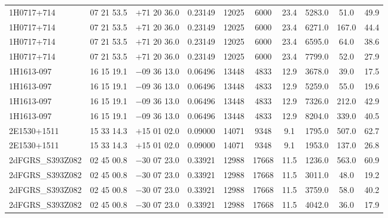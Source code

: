 \begin{landscape}
\begin{center}
\begin{longtable}{l c c c c c c c c c}
1H0717+714  &              07 21 53.5  &         $+$71 20 36.0  &       0.23149  & 12025  &   6000  &       23.4  &      5283.0  &  51.0  &   49.9  \\
1H0717+714  &              07 21 53.5  &         $+$71 20 36.0  &       0.23149  & 12025  &   6000  &       23.4  &      6271.0  &  167.0  &  44.4  \\
1H0717+714  &              07 21 53.5  &         $+$71 20 36.0  &       0.23149  & 12025  &   6000  &       23.4  &      6595.0  &  64.0  &   38.6  \\
1H0717+714  &              07 21 53.5  &         $+$71 20 36.0  &       0.23149  & 12025  &   6000  &       23.4  &      7799.0  &  52.0  &   27.9  \\
1H1613-097  &              16 15 19.1  &         $-$09 36 13.0  &       0.06496  & 13448  &   4833  &       12.9  &      3678.0  &  39.0  &   17.5  \\
1H1613-097  &              16 15 19.1  &         $-$09 36 13.0  &       0.06496  & 13448  &   4833  &       12.9  &      5259.0  &  55.0  &   19.6  \\
1H1613-097  &              16 15 19.1  &         $-$09 36 13.0  &       0.06496  & 13448  &   4833  &       12.9  &      7326.0  &  212.0  &  42.9  \\
1H1613-097  &              16 15 19.1  &         $-$09 36 13.0  &       0.06496  & 13448  &   4833  &       12.9  &      8204.0  &  339.0  &  40.5  \\
2E1530+1511  &             15 33 14.3  &         $+$15 01 02.0  &       0.09000  & 14071  &   9348  &       9.1  &       1795.0  &  507.0  &  62.7  \\
2E1530+1511  &             15 33 14.3  &         $+$15 01 02.0  &       0.09000  & 14071  &   9348  &       9.1  &       1953.0  &  137.0  &  26.8  \\
2dFGRS\_S393Z082  &        02 45 00.8  &         $-$30 07 23.0  &       0.33921  & 12988  &   17668  &      11.5  &      1236.0  &  563.0  &  60.9  \\
2dFGRS\_S393Z082  &        02 45 00.8  &         $-$30 07 23.0  &       0.33921  & 12988  &   17668  &      11.5  &      3011.0  &  48.0  &   19.2  \\
2dFGRS\_S393Z082  &        02 45 00.8  &         $-$30 07 23.0  &       0.33921  & 12988  &   17668  &      11.5  &      3759.0  &  58.0  &   40.2  \\
2dFGRS\_S393Z082  &        02 45 00.8  &         $-$30 07 23.0  &       0.33921  & 12988  &   17668  &      11.5  &      4042.0  &  36.0  &   17.9  \\

\end{longtable}
\end{center}
\end{landscape}
